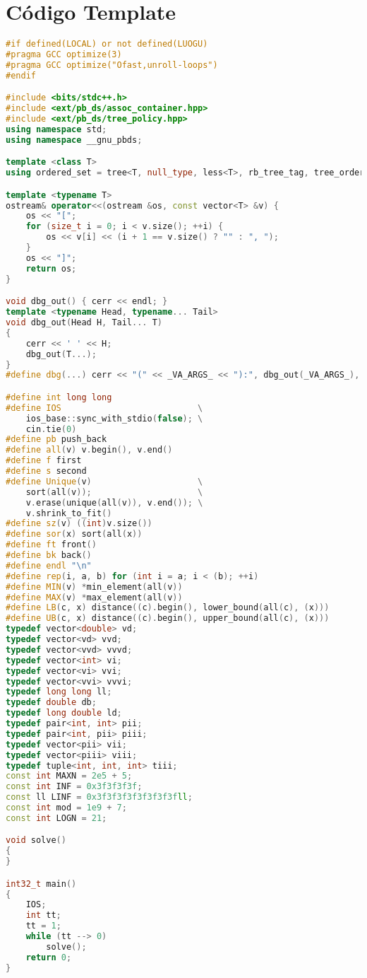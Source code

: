 \section*{Código Template}

\begin{lstlisting}[language=C++]
#if defined(LOCAL) or not defined(LUOGU)
#pragma GCC optimize(3)
#pragma GCC optimize("Ofast,unroll-loops")
#endif

#include <bits/stdc++.h>
#include <ext/pb_ds/assoc_container.hpp>
#include <ext/pb_ds/tree_policy.hpp>
using namespace std;
using namespace __gnu_pbds;

template <class T>
using ordered_set = tree<T, null_type, less<T>, rb_tree_tag, tree_order_statistics_node_update>;

template <typename T>
ostream& operator<<(ostream &os, const vector<T> &v) {
    os << "[";
    for (size_t i = 0; i < v.size(); ++i) {
        os << v[i] << (i + 1 == v.size() ? "" : ", ");
    }
    os << "]";
    return os;
}

void dbg_out() { cerr << endl; }
template <typename Head, typename... Tail>
void dbg_out(Head H, Tail... T)
{
    cerr << ' ' << H;
    dbg_out(T...);
}
#define dbg(...) cerr << "(" << _VA_ARGS_ << "):", dbg_out(_VA_ARGS_), cerr << endl

#define int long long
#define IOS                           \
    ios_base::sync_with_stdio(false); \
    cin.tie(0)
#define pb push_back
#define all(v) v.begin(), v.end()
#define f first
#define s second
#define Unique(v)                     \
    sort(all(v));                     \
    v.erase(unique(all(v)), v.end()); \
    v.shrink_to_fit()
#define sz(v) ((int)v.size())
#define sor(x) sort(all(x))
#define ft front()
#define bk back()
#define endl "\n"
#define rep(i, a, b) for (int i = a; i < (b); ++i)
#define MIN(v) *min_element(all(v))
#define MAX(v) *max_element(all(v))
#define LB(c, x) distance((c).begin(), lower_bound(all(c), (x)))
#define UB(c, x) distance((c).begin(), upper_bound(all(c), (x)))
typedef vector<double> vd;
typedef vector<vd> vvd;
typedef vector<vvd> vvvd;
typedef vector<int> vi;
typedef vector<vi> vvi;
typedef vector<vvi> vvvi;
typedef long long ll;
typedef double db;
typedef long double ld;
typedef pair<int, int> pii;
typedef pair<int, pii> piii;
typedef vector<pii> vii;
typedef vector<piii> viii;
typedef tuple<int, int, int> tiii;
const int MAXN = 2e5 + 5;
const int INF = 0x3f3f3f3f;
const ll LINF = 0x3f3f3f3f3f3f3f3fll;
const int mod = 1e9 + 7;
const int LOGN = 21;

void solve()
{
}

int32_t main()
{
    IOS;
    int tt;
    tt = 1;
    while (tt --> 0)
        solve();
    return 0;
}

\end{lstlisting}